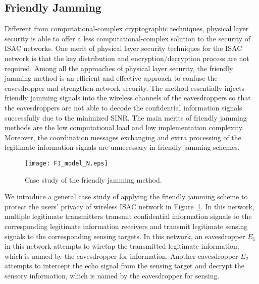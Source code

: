 \documentclass[10pt,journal,twocolumn,twoside]{IEEEtran} %
\begin{document}
\subsection{Friendly Jamming}
Different from computational-complex cryptographic techniques, physical layer security  is able to offer a less computational-complex solution to the security of ISAC networks. One merit of physical layer security techniques for the ISAC network is that the key distribution and encryption/decryption process are not required. Among all the approaches of physical layer security, the friendly jamming method is an efficient and effective approach to confuse the eavesdropper and strengthen network security. The method essentially injects friendly jamming signals into the wireless channels of the eavesdroppers so that the eavesdroppers are not able to decode the confidential information signals successfully due to the minimized SINR. The main merits of friendly jamming methods are the low computational load and low implementation complexity. Moreover, the coordination messages exchanging and extra processing of the legitimate information signals are unnecessary in friendly jamming schemes.

\begin{figure}[ht]
\centering
\texttt{[image: FJ\_model\_N.eps]}
\caption{Case study of the friendly jamming method.}
\label{fig: friendly-jamming_model}
\end{figure}


We introduce a general case study of applying the friendly jamming scheme to protect the users’ privacy of wireless ISAC network in Figure~\ref{fig: friendly-jamming_model}. In this network, multiple legitimate transmitters transmit confidential information signals to the corresponding legitimate information receivers and transmit legitimate sensing signals to the corresponding sensing targets. In this network, an eavesdropper  ${ E_1}$ in this network attempts to wiretap the transmitted legitimate information, which is named by the eavesdropper for information. Another eavesdropper ${E_2}$ attempts to intercept the echo signal from the sensing target and decrypt the sensory information, which is named by the eavesdropper for sensing.
\end{document}

